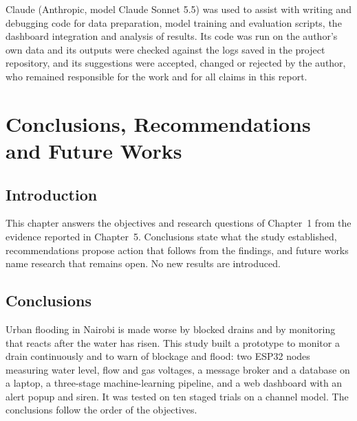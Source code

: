 \documentclass[12pt, a4paper]{article}
\begin{document}
Claude (Anthropic, model Claude Sonnet 5.5) was used to assist with writing and debugging code for data preparation, model training and evaluation scripts, the dashboard integration and analysis of results. Its code was run on the author's own data and its outputs were checked against the logs saved in the project repository, and its suggestions were accepted, changed or rejected by the author, who remained responsible for the work and for all claims in this report.

\clearpage
\section{Conclusions, Recommendations and Future Works}
\label{ch:conclusions}

\subsection{Introduction}

This chapter answers the objectives and research questions of Chapter~1 from the evidence reported in Chapter~5. Conclusions state what the study established, recommendations propose action that follows from the findings, and future works name research that remains open. No new results are introduced.

\subsection{Conclusions}

Urban flooding in Nairobi is made worse by blocked drains and by monitoring that reacts after the water has risen. This study built a prototype to monitor a drain continuously and to warn of blockage and flood: two ESP32 nodes measuring water level, flow and gas voltages, a message broker and a database on a laptop, a three-stage machine-learning pipeline, and a web dashboard with an alert popup and siren. It was tested on ten staged trials on a channel model. The conclusions follow the order of the objectives.
\end{document}
